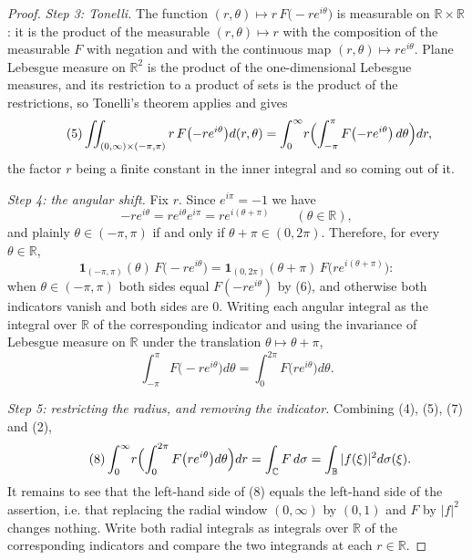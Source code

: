 \begin{proof}
\emph{Step 3: Tonelli.}  The function
$(r,\theta)\mapsto r\,F\bigl(-re^{i\theta}\bigr)$ is measurable on
$\mathbb{R}\times\mathbb{R}$: it is the product of the measurable
$(r,\theta)\mapsto r$ with the composition of the measurable $F$ with
negation and with the continuous map $(r,\theta)\mapsto re^{i\theta}$.  Plane
Lebesgue measure on $\mathbb{R}^{2}$ is the product of the one-dimensional
Lebesgue measures, and its restriction to a product of sets is the product of
the restrictions, so Tonelli's theorem applies and gives
\begin{equation}\tag{5}
  \iint_{(0,\infty)\times(-\pi,\pi)}r\,F\bigl(-re^{i\theta}\bigr)d(r,\theta)
  =\int_{0}^{\infty}\!r\Bigl(\int_{-\pi}^{\pi}
      F\bigl(-re^{i\theta}\bigr)\,d\theta\Bigr)dr ,
\end{equation}
the factor $r$ being a finite constant in the inner integral and so coming out
of it.

\emph{Step 4: the angular shift.}  Fix $r$.  Since $e^{i\pi}=-1$ we have
\begin{equation}\tag{6}
  -re^{i\theta}=re^{i\theta}e^{i\pi}=re^{i(\theta+\pi)}
  \qquad(\theta\in\mathbb{R}),
\end{equation}
and plainly $\theta\in(-\pi,\pi)$ if and only if $\theta+\pi\in(0,2\pi)$.
Therefore, for every $\theta\in\mathbb{R}$,
\[
  \mathbf1_{(-\pi,\pi)}(\theta)\,F\bigl(-re^{i\theta}\bigr)
  =\mathbf1_{(0,2\pi)}(\theta+\pi)\,F\bigl(re^{i(\theta+\pi)}\bigr):
\]
when $\theta\in(-\pi,\pi)$ both sides equal $F(-re^{i\theta})$ by (6), and
otherwise both indicators vanish and both sides are $0$.  Writing each angular
integral as the integral over $\mathbb{R}$ of the corresponding indicator and
using the invariance of Lebesgue measure on $\mathbb{R}$ under the translation
$\theta\mapsto\theta+\pi$,
\begin{equation}\tag{7}
  \int_{-\pi}^{\pi}F\bigl(-re^{i\theta}\bigr)d\theta
  =\int_{0}^{2\pi}F\bigl(re^{i\theta}\bigr)d\theta .
\end{equation}

\emph{Step 5: restricting the radius, and removing the indicator.}  Combining
(4), (5), (7) and (2),
\begin{equation}\tag{8}
  \int_{0}^{\infty}\!r\Bigl(\int_{0}^{2\pi}F\bigl(re^{i\theta}\bigr)
      d\theta\Bigr)dr
  =\int_{\mathbb{C}}F\,d\sigma
  =\int_{\mathbb{B}}|f(\xi)|^{2}d\sigma(\xi).
\end{equation}
It remains to see that the left-hand side of (8) equals the left-hand side of
the assertion, i.e. that replacing the radial window $(0,\infty)$ by $(0,1)$
and $F$ by $|f|^{2}$ changes nothing.  Write both radial integrals as
integrals over $\mathbb{R}$ of the corresponding indicators and compare the
two integrands at each $r\in\mathbb{R}$.


\end{proof}
